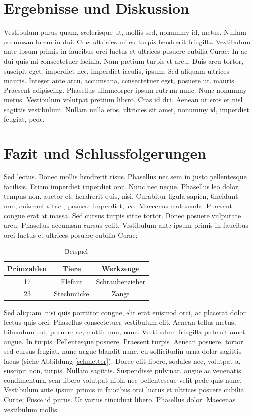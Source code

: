 \documentclass[paper=a4,fontsize=12pt,ngerman]{scrartcl}
\begin{document}
\section{Ergebnisse und Diskussion}
Vestibulum purus quam, scelerisque ut, mollis sed, nonummy id, metus. Nullam 
accumsan lorem in dui. Cras ultricies mi eu turpis hendrerit fringilla. 
Vestibulum ante ipsum primis in faucibus orci luctus et ultrices posuere 
cubilia Curae; In ac dui quis mi consectetuer lacinia. Nam pretium turpis et 
arcu. Duis arcu tortor, suscipit eget, imperdiet nec, imperdiet iaculis, 
ipsum. Sed aliquam ultrices mauris. Integer \cite{m85} ante arcu, accumsana, 
consectetuer eget, posuere ut, mauris. Praesent adipiscing. Phasellus 
ullamcorper ipsum rutrum nunc. Nunc nonummy metus. Vestibulum volutpat 
pretium libero. Cras id dui. Aenean ut eros et nisl sagittis vestibulum. 
Nullam nulla eros, ultricies sit amet, nonummy id, imperdiet feugiat, pede.

\section{Fazit und Schlussfolgerungen}
Sed lectus. Donec mollis hendrerit risus. Phasellus nec sem in justo 
pellentesque facilisis. Etiam imperdiet imperdiet orci. Nunc nec neque. 
Phasellus leo dolor, tempus non, auctor et, hendrerit quis, nisi. Curabitur 
ligula sapien, tincidunt non, euismod vitae \cite{arrow48}, posuere 
imperdiet, leo. Maecenas malesuada. Praesent congue erat at massa. Sed cursus 
turpis vitae tortor. Donec posuere vulputate arcu. Phasellus accumsan cursus 
velit. Vestibulum ante ipsum primis in faucibus orci luctus et ultrices 
posuere cubilia Curae; 
\begin{table}[h]
\begin{center}
  \begin{tabular}{ |c|c|c| } 
    \hline
    Primzahlen & Tiere & Werkzeuge \\ 
    \hline
    17 & Elefant    & Schraubenzieher \\ 
    23 & Stechmücke & Zange \\ 
    \hline
  \end{tabular}
    \caption{Beispiel}
\end{center}
\end{table}
Sed aliquam, nisi quis porttitor congue, elit erat euismod orci, ac placerat 
dolor lectus quis orci. Phasellus consectetuer vestibulum elit. Aenean tellus 
metus, bibendum sed, posuere ac, mattis non, nunc. Vestibulum fringilla pede 
sit amet augue. In turpis. Pellentesque posuere. Praesent turpis. Aenean 
posuere, tortor sed cursus feugiat, nunc augue blandit nunc, eu sollicitudin 
urna dolor sagittis lacus (siehe Abbildung \ref{schmetter}). Donec elit 
libero, sodales nec, volutpat a, suscipit non, turpis. Nullam sagittis. 
Suspendisse pulvinar, augue ac venenatis condimentum, sem libero volutpat 
nibh, nec pellentesque velit pede quis nunc. Vestibulum ante ipsum primis in 
faucibus orci luctus et ultrices posuere cubilia Curae; Fusce id purus. Ut 
varius tincidunt libero. Phasellus dolor. Maecenas vestibulum mollis
\end{document}
